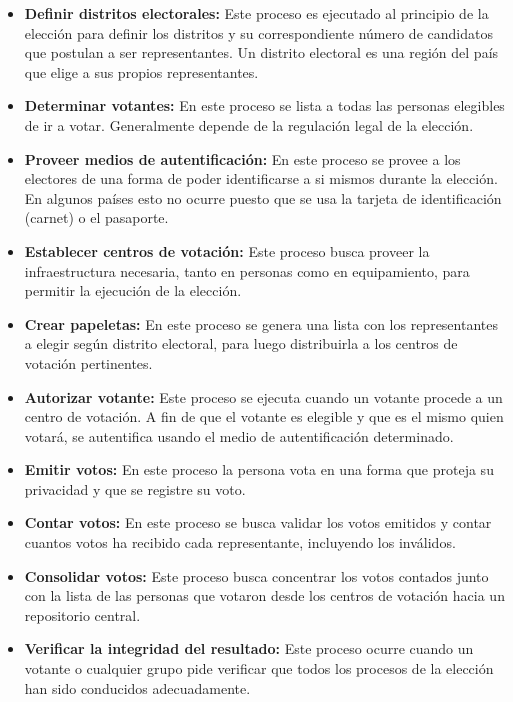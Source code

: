 \begin{itemize}

	\item \textbf{Definir distritos electorales:} Este proceso es ejecutado
		al principio de la elección para definir los distritos y su
		correspondiente número de candidatos que postulan a ser
		representantes. Un distrito electoral es una región del país que
		elige a sus propios representantes.
		
	\item \textbf{Determinar votantes:} En este proceso se lista a todas
		las personas elegibles de ir a votar. Generalmente depende 
		de la regulación legal de la elección.
	
	\item \textbf{Proveer medios de autentificación:} En este proceso
		se provee a los electores de una forma de poder identificarse
		a si mismos durante la elección. En algunos países esto no
		ocurre puesto que se usa la tarjeta de identificación (carnet) o
		el pasaporte. 
	
	\item \textbf{Establecer centros de votación:} Este proceso busca 
		proveer la infraestructura necesaria, tanto en personas como
		en equipamiento, para permitir la ejecución de la elección.
	
	\item \textbf{Crear papeletas:} En este proceso se genera una lista
		con los representantes a elegir según distrito electoral, para 
		luego distribuirla a los centros de votación pertinentes.
	
	\item \textbf{Autorizar votante:} Este proceso se ejecuta cuando un 
		votante procede a un centro de votación. A fin de que el votante
		es elegible y que es el mismo quien votará, se autentifica usando
		el medio de autentificación determinado.
		
	\item \textbf{Emitir votos:} En este proceso la persona vota en una 
		forma que proteja su privacidad y que se registre su voto.
		
	\item \textbf{Contar votos:} En este proceso se busca validar los votos
		emitidos y contar cuantos votos ha recibido cada representante,
		incluyendo los inválidos.
		
	\item \textbf{Consolidar votos:} Este proceso busca concentrar los
		votos contados junto con la lista de las personas que votaron
		desde los centros de votación hacia un repositorio central.
	
	\item \textbf{Verificar la integridad del resultado:} Este proceso ocurre
		cuando un votante o cualquier grupo pide verificar que todos los
		procesos de la elección han sido conducidos adecuadamente.

\end{itemize}


